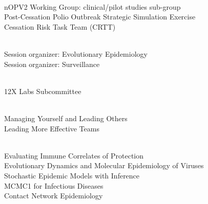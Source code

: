 \documentclass{article}
\begin{document}
\begin{llist}
 \\
nOPV2 Working Group:  clinical/pilot studies sub-group  \\
Post-Cessation Polio Outbreak Strategic Simulation Exercise \\
Cessation Risk Task Team (CRTT) 


 \\
Session organizer: Evolutionary Epidemiology  \\
Session organizer: Surveillance 

 

\\
12X Labs Subcommittee 




 \vspace{4pt}

  \\
Managing Yourself and Leading Others \\
Leading More Effective Teams 

 \\
Evaluating Immune Correlates of Protection \\ 
Evolutionary Dynamics and Molecular Epidemiology of Viruses  \\
Stochastic Epidemic Models with Inference   \\
MCMC1 for Infectious Diseases  \\ 
Contact Network Epidemiology  


\end{llist}
\end{document}
